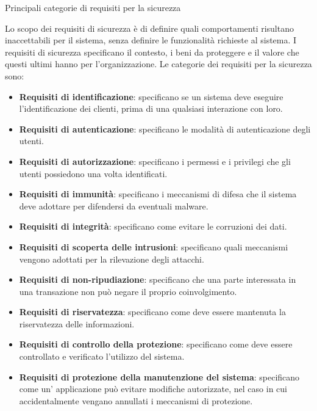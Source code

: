 \begin{problem}{2.6}
Principali categorie di requisiti per la sicurezza
\end{problem}
\begin{solution}
Lo scopo dei requisiti di sicurezza è di definire quali comportamenti risultano inaccettabili per il sistema, senza definire le funzionalità richieste al sistema.
I requisiti di sicurezza specificano il contesto, i beni da proteggere e il valore che questi ultimi hanno per l'organizzazione.
\newline
Le categorie dei requisiti per la sicurezza sono:
\begin{itemize}
	\item \textbf{Requisiti di identificazione}: specificano se un sistema deve eseguire l'identificazione dei clienti, prima di una qualsiasi interazione con loro.
	\item \textbf{Requisiti di autenticazione}: specificano le modalità di autenticazione degli utenti.
	\item \textbf{Requisiti di autorizzazione}: specificano i permessi e i privilegi che gli utenti possiedono una volta identificati.
	\item \textbf{Requisiti di immunità}: specificano i meccanismi di difesa che il sistema deve adottare per difendersi da eventuali malware.
	\item \textbf{Requisiti di integrità}: specificano come evitare le corruzioni dei dati.
	\item \textbf{Requisiti di scoperta delle intrusioni}: specificano quali meccanismi vengono adottati per la rilevazione degli attacchi.
	\item \textbf{Requisiti di non-ripudiazione}: specificano che una parte interessata in una transazione non può negare il proprio coinvolgimento.
	\item \textbf{Requisiti di riservatezza}: specificano come deve essere mantenuta la riservatezza delle informazioni.
	\item \textbf{Requisiti di controllo della protezione}: specificano come deve essere controllato e verificato l'utilizzo del sistema.
	\item \textbf{Requisiti di protezione della manutenzione del sistema}: specificano come un' applicazione può evitare modifiche autorizzate, nel caso in cui accidentalmente vengano annullati i meccanismi di protezione.
\end{itemize}
\end{solution}


